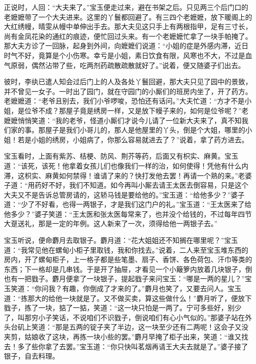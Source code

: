 \documentclass[12pt,oneside]{book}
\begin{document}
正说时，人回：“大夫来了。”宝玉便走过来，避在书架之后。只见两三个后门口的老嬷嬷带了一个大夫进来。这里的丫鬟都回避了。有三四个老嬷嬷，放下暖阁上的大红绣幔，晴雯从幔中单伸出手去。那大夫见这只手上有两根指甲，足有三寸长，尚有金凤花染的通红的痕迹，便忙回过头来。有一个老嬷嬷忙拿了一块手帕掩了。那大夫方诊了一回脉，起身到外间，向嬷嬷们说道：“小姐的症是外感内滞，近日时气不好，竟算是个小伤寒。幸亏是小姐，素日饮食有限，风寒也不大，不过是血气原弱，偶然沾带了些，吃两剂药疏散疏散就好了。”说着，便又随婆子们出去。

彼时，李纨已遣人知会过后门上的人及各处丫鬟回避，那大夫只见了园中的景致，并不曾见一女子。一时出了园门，就在守园门的小厮们的班房内坐了，开了药方。老嬷嬷道：“老爷且别去，我们小爷啰唆，恐怕还有话问。”大夫忙道：“方才不是小姐，是位爷不成？那屋子竟是绣房一样，又是放下幔子来的，如何是位爷呢？”老嬷嬷悄悄笑道：“我的老爷，怪道小厮们才说今儿请了一位新大夫来了，真不知我们家的事。那屋子是我们小哥儿的，那人是他屋里的丫头，倒是个大姐，哪里的小姐！若是小姐的绣房，小姐病了，你那么容易就进去了？”说着，拿了药方进去。

宝玉看时，上面有紫苏、桔梗、防风、荆芥等药，后面又有枳实、麻黄。宝玉道：“该死，该死！他拿着女孩儿们也像我们一样的治，如何使得！凭他有什么内滞，这枳实、麻黄如何禁得！谁请了来的？快打发他去罢！再请一个熟的来。”老婆子道：“用药好不好，我们不知道。如今再叫小厮去请王太医去倒容易，只是这个大夫又不是告诉总管房请的，这轿马钱是要给他的。”宝玉道：“给他多少？”婆子道：“少了不好看，也得一两银子，才是我们这门户的礼。”宝玉道：“王太医来了给他多少？”婆子笑道：“王太医和张太医每常来了，也并没个给钱的，不过每年四节大趸送礼，那是一定的年例。这人新来了一次，须得给他一两银子去。”

宝玉听说，便命麝月去取银子。麝月道：“花大姐姐还不知搁在哪里呢？”宝玉道：“我常见他在螺甸小柜子里取钱，我和你找去。”说着，二人来至宝玉堆东西的房内，开了螺甸柜子，上一格子都是些笔墨、扇子、香饼、各色荷包、汗巾等类的东西；下一格却是几串钱。于是开了抽屉，才看见一个小簸箩内放着几块银子，倒也有一把戥子。麝月便拿了一块银子，提起戥子来问宝玉：“哪是一两的星儿？”宝玉笑道：“你问我？有趣，你倒成了才来的了。”麝月也笑了，又要去问人。宝玉道：“拣那大的给他一块就是了。又不做买卖，算这些做什么！”麝月听了，便放下戥子，拣了一块，掂了一掂，笑道：“这一块只怕是一两了。宁可多些好，别少了，叫那穷小子笑话，不说咱们不识戥子，倒说咱们有心小气似的。”那婆子站在外头台矶上笑道：“那是五两的锭子夹了半边，这一块至少还有二两呢！这会子又没夹剪，姑娘收了这块，再拣一块小些的罢。”麝月早掩了柜子出来，笑道：“谁又找去！多了些你拿了去罢。”宝玉道：“你只快叫茗烟再请王大夫去就是了。”婆子接了银子，自去料理。
\end{document}

